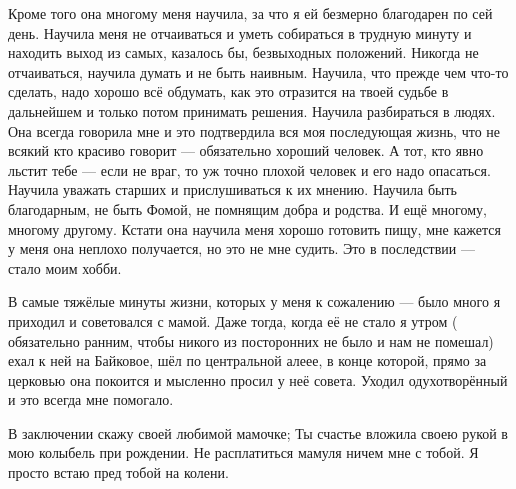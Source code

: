 Кроме того она многому меня научила, за что я ей безмерно благодарен по сей
день.  Научила меня не отчаиваться и уметь собираться в трудную минуту и
находить выход из самых, казалось бы, безвыходных положений. Никогда не
отчаиваться, научила думать и не быть наивным. Научила, что прежде  чем что-то
сделать, надо хорошо всё обдумать, как это отразится на  твоей судьбе в
дальнейшем и только потом принимать решения.  Научила разбираться в людях. Она
всегда говорила мне и это подтвердила вся моя последующая  жизнь, что не всякий
кто красиво говорит — обязательно хороший человек. А тот, кто явно льстит тебе
—  если не враг, то уж   точно плохой человек и его надо опасаться. Научила
уважать старших и прислушиваться к их мнению. Научила быть благодарным, не быть
Фомой, не помнящим  добра и родства.  И ещё многому, многому другому. Кстати
она научила меня  хорошо готовить пищу,   мне кажется у меня она неплохо
получается, но это не мне судить. Это в последствии  — стало моим хобби.

В самые тяжёлые  минуты жизни, которых у меня к сожалению — было много я
приходил и советовался с мамой. Даже тогда, когда её не стало я  утром (
обязательно ранним, чтобы никого из посторонних не было и нам не помешал) ехал
к ней  на Байковое, шёл по центральной алеее,  в конце которой, прямо за
церковью она покоится и мысленно просил у неё совета. Уходил одухотворённый и
это всегда мне помогало.

В заключении скажу своей любимой мамочке; Ты счастье вложила своею рукой в мою
колыбель при рождении. Не расплатиться мамуля  ничем мне с тобой. Я просто
встаю пред тобой на колени.
